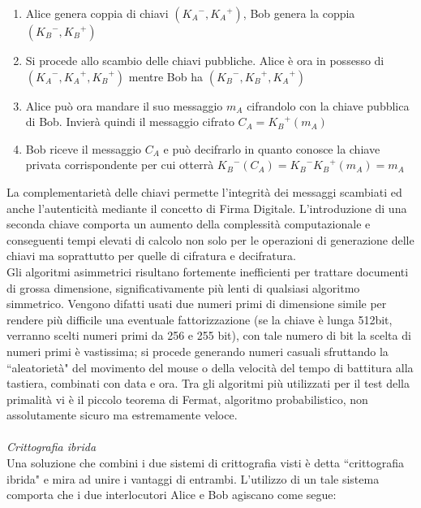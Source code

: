 \documentclass[a4paper,12pt]{tesiinfo}
\begin{document}
\begin{enumerate}
    \item Alice genera coppia di chiavi $({K_A}^-, {K_A}^+)$, Bob genera la coppia $({K_B}^-, {K_B}^+)$
    \item Si procede allo scambio delle chiavi pubbliche. Alice \`e ora in possesso di $({K_A}^-, {K_A}^+, {K_B}^+)$ mentre Bob ha $({K_B}^-, {K_B}^+, {K_A}^+)$
    \item Alice pu\`o ora mandare il suo messaggio $m_A$ cifrandolo con la chiave pubblica di Bob. Invier\`a quindi il messaggio cifrato $C_A = {K_B}^+(m_A)$
    \item Bob riceve il messaggio $C_A$ e pu\`o decifrarlo in quanto conosce la chiave privata corrispondente per cui otterr\`a ${K_B}^-(C_A) = {K_B}^-{K_B}^+(m_A) = m_A$
\end{enumerate}
La complementariet\`a delle chiavi permette l'integrit\`a dei messaggi scambiati ed anche l'autenticit\`a mediante il concetto di Firma Digitale. L'introduzione di una seconda chiave comporta un aumento della complessit\`a computazionale e conseguenti tempi elevati di calcolo non solo per le operazioni di generazione delle chiavi ma soprattutto per quelle di cifratura e decifratura.
\\
Gli algoritmi asimmetrici risultano fortemente inefficienti per trattare documenti di grossa dimensione, significativamente pi\`u lenti di qualsiasi algoritmo simmetrico. Vengono difatti usati due numeri primi di dimensione simile per rendere pi\`u difficile una eventuale fattorizzazione (se la chiave \`e lunga 512bit, verranno scelti numeri primi da 256 e 255 bit), con tale numero di bit la scelta di numeri primi \`e vastissima; si procede generando numeri casuali sfruttando la ``aleatoriet\`a" del movimento del mouse o della velocit\`a del tempo di battitura alla tastiera, combinati con data e ora. Tra gli algoritmi pi\`u utilizzati per il test della primalit\`a vi \`e il piccolo teorema di Fermat, algoritmo probabilistico, non assolutamente sicuro ma estremamente veloce. 
\\
\\
\textit{Crittografia ibrida}
\\
Una soluzione che combini i due sistemi di crittografia visti \`e detta ``crittografia ibrida" e mira ad unire i vantaggi di entrambi. L'utilizzo di un tale sistema comporta che i due interlocutori Alice e Bob agiscano come segue:
\end{document}
